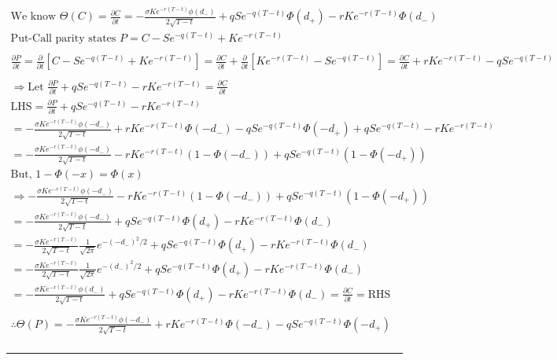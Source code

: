 \documentclass[letterpaper,10pt]{article}
\newcommand{\partiald}[2]{\frac{\partial #1}{\partial #2}}
\begin{document}
			\begin{gather*}
				\text{We know } \Theta(C) = \partiald{C}{t} = - \frac{\sigma K e^{-r(T-t)}\phi(d_-)}{2\sqrt{T-t}} + qSe^{-q(T-t)}\Phi(d_+) - rKe^{-r(T-t)}\Phi(d_-) \\
				\text{Put-Call parity states } P = C - Se^{-q(T-t)} + Ke^{-r(T-t)} \\
				\\
				\partiald{P}{t} = \partiald{}{t} \left[ C - Se^{-q(T-t)} + Ke^{-r(T-t)} \right] = \partiald{C}{t} + \partiald{}{t} \left[ Ke^{-r(T-t)} - Se^{-q(T-t)} \right] = \partiald{C}{t} + rKe^{-r(T-t)} - qSe^{-q(T-t)} \\
				\\
				\Rightarrow \text{Let } \partiald{P}{t} + qSe^{-q(T-t)} - rKe^{-r(T-t)} = \partiald{C}{t} \\
				\text{LHS} = \partiald{P}{t} + qSe^{-q(T-t)} - rKe^{-r(T-t)} \\
				= - \frac{\sigma K e^{-r(T-t)} \phi(-d_-)}{2\sqrt{T-t}} + rKe^{-r(T-t)} \Phi(-d_-) - qSe^{-q(T-t)}\Phi(-d_+) + qSe^{-q(T-t)} - rKe^{-r(T-t)} \\
				= - \frac{\sigma K e^{-r(T-t)} \phi(-d_-)}{2\sqrt{T-t}} - rKe^{-r(T-t)}(1 - \Phi(-d_-)) + qSe^{-q(T-t)}(1-\Phi(-d_+)) \\
				\text{But, } 1-\Phi(-x) = \Phi(x) \\
				\Rightarrow - \frac{\sigma K e^{-r(T-t)} \phi(-d_-)}{2\sqrt{T-t}} - rKe^{-r(T-t)}(1 - \Phi(-d_-)) + qSe^{-q(T-t)}(1-\Phi(-d_+)) \\
				= - \frac{\sigma K e^{-r(T-t)} \phi(-d_-)}{2\sqrt{T-t}} + qSe^{-q(T-t)}\Phi(d_+) - rKe^{-r(T-t)}\Phi(d_-) \\
				= - \frac{\sigma K e^{-r(T-t)}}{2\sqrt{T-t}}\frac{1}{\sqrt{2\pi}}e^{-(-d_-)^2/2} + qSe^{-q(T-t)}\Phi(d_+) - rKe^{-r(T-t)}\Phi(d_-) \\
				= - \frac{\sigma K e^{-r(T-t)}}{2\sqrt{T-t}}\frac{1}{\sqrt{2\pi}}e^{-(d_-)^2/2} + qSe^{-q(T-t)}\Phi(d_+) - rKe^{-r(T-t)}\Phi(d_-) \\
				= - \frac{\sigma K e^{-r(T-t)}\phi(d_-)}{2\sqrt{T-t}}+ qSe^{-q(T-t)}\Phi(d_+) - rKe^{-r(T-t)}\Phi(d_-) = \partiald{C}{t} = \text{RHS} \\
				\\
				\boxed{\therefore \Theta(P) = - \frac{\sigma K e^{-r(T-t)} \phi(-d_-)}{2\sqrt{T-t}} + rKe^{-r(T-t)} \Phi(-d_-) - qSe^{-q(T-t)}\Phi(-d_+)}
				\\
			\end{gather*}

		\hrule
\end{document}
